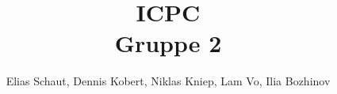 \title[Grundbegriffe der Informatik]{ICPC\\Gruppe 2}
\date{\tutdate}
\subtitle{\tutTitle}
\author{Elias Schaut, Dennis Kobert, Niklas Kniep, Lam Vo, Ilia Bozhinov}

\institute{}


%


%
